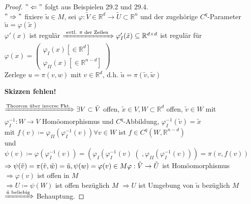 \begin{proof}

$"\Leftarrow"$ folgt aus Beispielen 29.2 und 29.4. \\
$"\Rightarrow"$ fixiere $\tilde{u} \in M $, sei $\varphi : \tilde{V} \in \mathbb{R}^d
\rightarrow \tilde{U} \subset \mathbb{R}^n $ und der zugehörige $C^q$-Parameter 
$\tilde{u} = \varphi (\tilde{x})$ \\
$\varphi' (x)$ ist regulär $\xRightarrow{\text{ evtl. $\pi$ der Zeilen }} \varphi_I ' 
(\tilde{x}) \subseteq \mathbb{R}^{d \times d} $ ist regulär für $\varphi (x) =
    \begin{pmatrix}
    \varphi_I (x) \left[ \in \mathbb{R}^d \right]\\
    \varphi_{II} (x) \left[ \in \mathbb{R}^{n-d} \right]
    \end{pmatrix}
$ \\
Zerlege $u = \pi (v,w) $ mit $v \in \mathbb{R}^d $, 
d.h. $\tilde{u} = \pi (\tilde{v},\tilde{w})$

\textbf{Skizzen fehlen!}

$\xRightarrow{\text{Theorem über inverse Fkt.}} \exists V \subset \tilde{V} $ offen,
$\tilde{x} \in V, W \subset \mathbb{R}^d $ offen, $\tilde{v} \in W $
mit $\varphi_I ^{-1} : W \rightarrow V $ Homöomorphismus und $C^q$-Abbildung,
$\varphi_I ^{-1} (\tilde{v}) = \tilde{x} $ \\
mit $f(v) \coloneqq \varphi_{II} \left(\varphi_I ^{-1} (v)\right) \forall v \in W $ ist 
$f \in C^q \left(W, \mathbb{R}^{n-d}\right) $ \\
und $\psi (v) \coloneqq \varphi \left(\varphi_I ^{-1} (v) \right) =
\left( \varphi_I \left(\varphi_I ^{-1} (v) \right( ,
\varphi_{II} \left(\varphi_I ^ {-1} (v) \right) \right) = \pi \left(v, f(v)\right) $ \\
$\Rightarrow \psi (\tilde{v}) = \pi (\tilde{v}, \tilde{w}) = \tilde{u},
\psi (w) = \varphi (v) \in M \\
\varphi : \tilde{V} \rightarrow \tilde{U} $ ist Homöomorphismus \\
$\Rightarrow \varphi (v) $ ist offen in $M$ \\
$ \Rightarrow U \coloneqq \psi (W) $ ist offen bezüglich $M$
$\Rightarrow U $ ist Umgebung von $\tilde{u} $ bezüglich $M$ \\
$\xRightarrow{\tilde{u} \text{ beliebig}} $ Behauptung. 

\end{proof}

